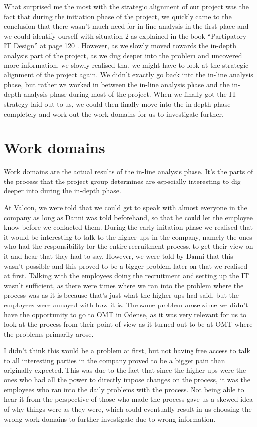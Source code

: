 What surprised me the most with the strategic alignment of our project was the fact that during the initiation phase of the project, we quickly came to the conclusion that there wasn’t much need for in line analysis in the first place and we could identify ourself with situation 2 as explained in the book “Partipatory IT Design” at page 120 . However, as we slowly moved towards the in-depth analysis part of the project, as we dug deeper into the problem and uncovered more information, we slowly realised that we might have to look at the strategic alignment of the project again.
We didn’t exactly go back into the in-line analysis phase, but rather we worked in between the in-line analysis phase and the in-depth analysis phase during most of the project. When we finally got the IT strategy laid out to us, we could then finally move into the in-depth phase completely and work out the work domains for us to investigate further.

\section{Work domains}
Work domains are the actual results of the in-line analysis phase. It’s the parts of the process that the project group determines are especially interesting to dig deeper into during the in-depth phase. 

At Valcon, we were told that we could get to speak with almost everyone in the company as long as Danni was told beforehand, so that he could let the employee know before we contacted them. During the early initation phase we realised that it would be interesting to talk to the higher-ups in the company, namely the ones who had the responsibility for the entire recruitment process, to get their view on it and hear that they had to say. However, we were told by Danni that this wasn’t possible and this proved to be a bigger problem later on that we realised at first. 
Talking with the employees doing the recruitment and setting up the IT wasn’t sufficient, as there were times where we ran into the problem where the process was as it is because that’s just what the higher-ups had said, but the employees were annoyed with how it is. The same problem arose since we didn’t have the opportunity to go to OMT in Odense, as it was very relevant for us to look at the process from their point of view as it turned out to be at OMT where the problems primarily arose.

I didn’t think this would be a problem at first, but not having free access to talk to all interesting parties in the company proved to be a bigger pain than originally expected. This was due to the fact that since the higher-ups were the ones who had all the power to directly impose changes on the process, it was the employees who ran into the daily problems with the process. Not being able to hear it from the perspective of those who made the process gave us a skewed idea of why things were as they were, which could eventually result in us choosing the wrong work domains to further investigate due to wrong information.

